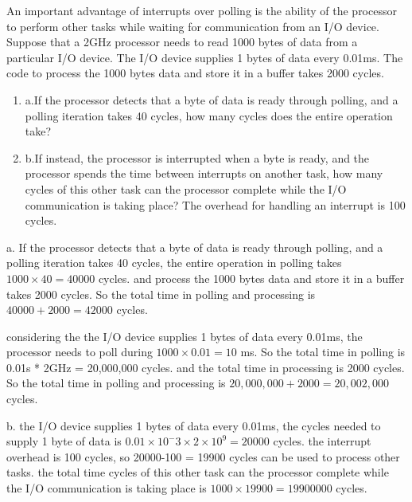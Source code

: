 \documentclass[cn,12pt]{homework}
\begin{document}
\begin{problem}


An important advantage of interrupts over polling is the ability of the processor to perform other tasks while waiting for 
communication from an I/O device. Suppose that a 2GHz processor needs to read 1000 bytes of data from a particular I/O device. 
The I/O device supplies 1 bytes of data every 0.01ms. The code to process the 1000 bytes data and store it in a buffer takes 2000 cycles.

  \begin{enumerate}
    \item a.If the processor detects that a byte of data is ready through polling, and a polling iteration takes 40 cycles, how many cycles does the entire operation take?
    \item b.If instead, the processor is interrupted when a byte is ready, and the processor spends the time between interrupts on another task, how many cycles of this other task can the processor complete 
    while the I/O communication is taking place? The overhead for handling an interrupt is 100 cycles.
  \end{enumerate}
\end{problem}




\begin{solution}
  \quad
  a. If the processor detects that a byte of data is ready through polling, and a polling iteration takes 40 cycles, the entire operation in polling takes $1000 \times 40 = 40000$ cycles.
  and process the 1000 bytes data and store it in a buffer takes 2000 cycles. So the total time in polling and processing is $40000 + 2000 = 42000$ cycles.

  considering the the I/O device supplies 1 bytes of data every 0.01ms, the processor needs to poll during  $1000 \times 0.01 = 10$ ms. So the total time in polling is 0.01s * 2GHz = 20,000,000 cycles.
  and the total time in processing is 2000 cycles. So the total time in polling and processing is $20,000,000 + 2000 = 20,002,000$ cycles.

  b. the I/O device supplies 1 bytes of data every 0.01ms, the cycles needed to supply 1 byte of data is $0.01 \times 10^-3 \times 2 \times 10^9 = 20000$ cycles. the interrupt overhead is 100 cycles, so 20000-100 = 19900 cycles can be used to process other tasks. the total time cycles of this other task can the processor complete while the I/O communication is taking place is $1000 \times 19900 = 19900000$ cycles.

\end{solution}









\end{document}
